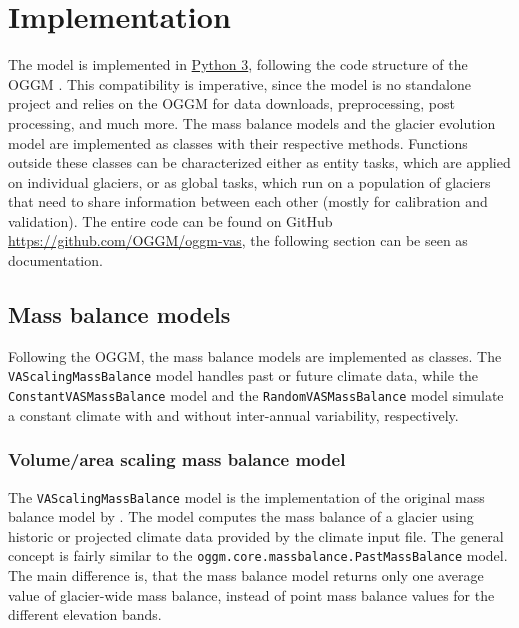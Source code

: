 

\section{Implementation} %
\label{sec:implementation}

    The \vas{} model is implemented in \href{https://www.python.org/}{Python 3}, following the code structure of the OGGM \citep{Maussion2019}. This compatibility is imperative, since the \vas{} model is no standalone project and relies on the OGGM for data downloads, preprocessing, post processing, and much more. The mass balance models and the glacier evolution model are implemented as classes with their respective methods. Functions outside these classes can be characterized either as entity tasks, which are applied on individual glaciers, or as global tasks, which run on a population of glaciers that need to share information between each other (mostly for calibration and validation). The entire code can be found on GitHub \url{https://github.com/OGGM/oggm-vas}, the following section can be seen as documentation.

    \subsection{Mass balance models} %
    \label{sub:mass_balance_models_implementation}

        Following the OGGM, the mass balance models are implemented as classes. The \lstinline`VAScalingMassBalance` model handles past or future climate data, while the \lstinline`ConstantVASMassBalance` model and the \lstinline`RandomVASMassBalance` model simulate a constant climate with and without inter-annual variability, respectively.

        \subsubsection{Volume/area scaling mass balance model} %
        \label{ssub:volume_area_scaling_mass_balance_model_implementation}

            The \lstinline`VAScalingMassBalance` model is the implementation of the original mass balance model by \citet{Marzeion2012b}. The model computes the mass balance of a glacier using historic or projected climate data provided by the climate input file. The general concept is fairly similar to the \lstinline`oggm.core.massbalance.PastMassBalance` model. The main difference is, that the \vas{} mass balance model returns only one average value of glacier-wide mass balance, instead of point mass balance values for the different elevation bands.

